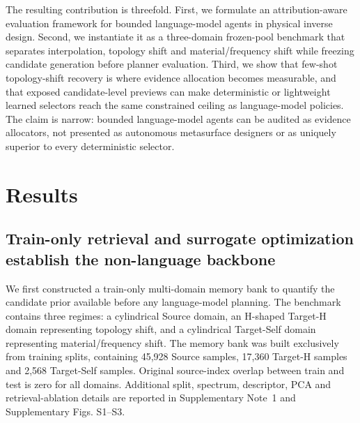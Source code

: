 \documentclass[final,1p,times]{elsarticle}
\begin{document}
The resulting contribution is threefold. First, we formulate an attribution-aware evaluation framework for bounded language-model agents in physical inverse design. Second, we instantiate it as a three-domain frozen-pool benchmark that separates interpolation, topology shift and material/frequency shift while freezing candidate generation before planner evaluation. Third, we show that few-shot topology-shift recovery is where evidence allocation becomes measurable, and that exposed candidate-level previews can make deterministic or lightweight learned selectors reach the same constrained ceiling as language-model policies. The claim is narrow: bounded language-model agents can be audited as evidence allocators, not presented as autonomous metasurface designers or as uniquely superior to every deterministic selector.



\section{Results}


\subsection{Train-only retrieval and surrogate optimization establish the non-language backbone}

We first constructed a train-only multi-domain memory bank to quantify the candidate prior available before any language-model planning. The benchmark contains three regimes: a cylindrical Source domain, an H-shaped Target-H domain representing topology shift, and a cylindrical Target-Self domain representing material/frequency shift. The memory bank was built exclusively from training splits, containing 45,928 Source samples, 17,360 Target-H samples and 2,568 Target-Self samples. Original source-index overlap between train and test is zero for all domains. Additional split, spectrum, descriptor, PCA and retrieval-ablation details are reported in Supplementary Note~1 and Supplementary Figs. S1--S3.
\end{document}
